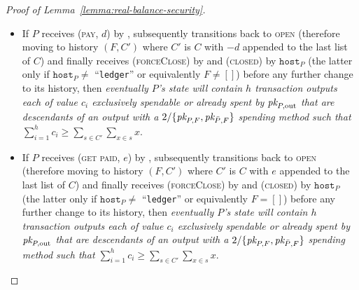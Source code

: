 \begin{proof}[Proof of Lemma~\ref{lemma:real-balance-security}]
\begin{itemize}
    change to its history, then \emph{eventually $P$'s \ledger state will
    contain $h$ transaction outputs each of value $c_i$ exclusively spendable or
    already spent by $\pk{P, \mathrm{out}}$ that are descendants of an output
    with spending method $2/\{\pk{P, F}, \pk{\bar{P}, F}\}$ such that
    $\sum\limits_{i=1}^h c_i \geq \sum\limits_{s \in C} \sum\limits_{x \in s}
    x$}. Furthermore, given that $P$ moves to the \textsc{open} state after the
    (\textsc{virtualising}, $\dots$) message and in case it sends
    (\textsc{funded}, $\dots$) to some party $R$
    (Fig.~\ref{code:ln:virtualise:start-end},
    l.~\ref{code:ln:virtualise:start-end:helper-output-funded}), the latter
    party is the (local, kindred) \texttt{fundee} of a new virtual channel. If
    subsequently the state of $R$ transitions to \textsc{open} (therefore
    obtaining history $(F_R, C_R)$ where $F_R = F + C$ and $C_R = [[0]]$), and
    finally receives (\textsc{forceClose}) by \environment and (\textsc{closed}) by
    $\texttt{host}_R$ ($\texttt{host}_R = \texttt{host}_P$ --
    Fig.~\ref{code:ln:bob}, l.~\ref{code:ln:bob:host}) before any further change
    to its history, then \emph{eventually $R$'s \ledger state will contain an
    output with a $2/\{\pk{R, F}, \pk{\bar{R}, F}\}$ spending method.}
    \item If $P$ receives (\textsc{pay}, $d$) by \environment, subsequently
    transitions back to \textsc{open} (therefore moving to history $(F, C')$
    where $C'$ is $C$ with $-d$ appended to the last list of $C$) and finally
    receives (\textsc{forceClose}) by \environment and (\textsc{closed}) by
    $\texttt{host}_P$ (the latter only if $\texttt{host}_P \neq$ ``\texttt{ledger}'' or
    equivalently $F \neq []$) before any further change to its history, then
    \emph{eventually $P$'s \ledger state will contain $h$ transaction outputs
    each of value $c_i$ exclusively spendable or already spent by $\pk{P,
    \mathrm{out}}$ that are descendants of an output with a $2/\{\pk{P, F},
    \pk{\bar{P}, F}\}$ spending method such that $\sum\limits_{i=1}^h c_i \geq
    \sum\limits_{s \in C'} \sum\limits_{x \in s} x$}.
    \item If $P$ receives (\textsc{get paid}, $e$) by \environment, subsequently
    transitions back to \textsc{open} (therefore moving to history $(F, C')$
    where $C'$ is $C$ with $e$ appended to the last list of $C$) and finally
    receives (\textsc{forceClose}) by \environment and (\textsc{closed}) by
    $\texttt{host}_P$ (the latter only if $\texttt{host}_P \neq$ ``\texttt{ledger}'' or
    equivalently $F = []$) before any further change to its history, then
    \emph{eventually $P$'s \ledger state will contain $h$ transaction outputs
    each of value $c_i$ exclusively spendable or already spent by $\pk{P,
    \mathrm{out}}$ that are descendants of an output with a $2/\{\pk{P, F},
    \pk{\bar{P}, F}\}$ spending method such that $\sum\limits_{i=1}^h c_i \geq
    \sum\limits_{s \in C'} \sum\limits_{x \in s} x$}.
  \end{itemize}


\end{proof}
